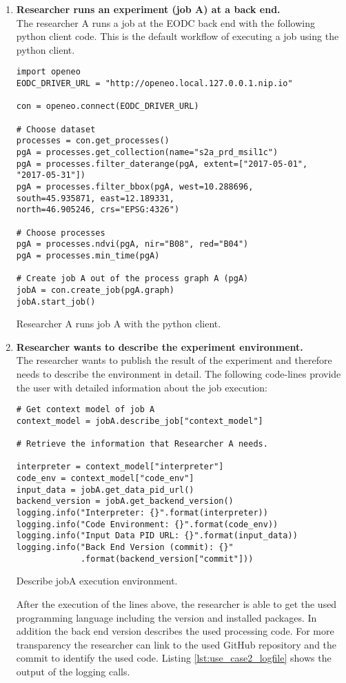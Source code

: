 \documentclass[draft,final]{vutinfth} %
\newenvironment{code}{\captionsetup{type=listing}}{}
\begin{document}
\begin{enumerate}
	\item \textbf{Researcher runs an experiment (job A) at a back end.}\\
	The researcher A runs a job at the EODC back end with the following python client code. This is the default workflow of executing a job using the python client.  

\begin{code}
	\begin{verbatim}
import openeo
EODC_DRIVER_URL = "http://openeo.local.127.0.0.1.nip.io"

con = openeo.connect(EODC_DRIVER_URL)

# Choose dataset
processes = con.get_processes()
pgA = processes.get_collection(name="s2a_prd_msil1c")
pgA = processes.filter_daterange(pgA, extent=["2017-05-01", 
"2017-05-31"])
pgA = processes.filter_bbox(pgA, west=10.288696, 
south=45.935871, east=12.189331, 
north=46.905246, crs="EPSG:4326")

# Choose processes
pgA = processes.ndvi(pgA, nir="B08", red="B04")
pgA = processes.min_time(pgA)

# Create job A out of the process graph A (pgA)
jobA = con.create_job(pgA.graph)
jobA.start_job()
	\end{verbatim}
	\caption{Researcher A runs job A with the python client.}
	\label{lst:impl_usecase2_1}
\end{code}
	\item \textbf{Researcher wants to describe the experiment environment.}\\
	The researcher wants to publish the result of the experiment and therefore needs to describe the environment in detail. The following code-lines provide the user with detailed information about the job execution:

\begin{code}
	\begin{verbatim}
# Get context model of job A
context_model = jobA.describe_job["context_model"]

# Retrieve the information that Researcher A needs.

interpreter = context_model["interpreter"]
code_env = context_model["code_env"]
input_data = jobA.get_data_pid_url()
backend_version = jobA.get_backend_version()
logging.info("Interpreter: {}".format(interpreter))
logging.info("Code Environment: {}".format(code_env))
logging.info("Input Data PID URL: {}".format(input_data))
logging.info("Back End Version (commit): {}"
             .format(backend_version["commit"]))
	\end{verbatim}
	\caption{Describe jobA execution environment.}
	\label{lst:impl_usecase2_2}
\end{code}
	After the execution of the lines above, the researcher is able to get the used programming language including the version and installed packages. In addition the back end version describes the used processing code. For more transparency the researcher can link to the used GitHub repository and the commit to identify the used code. Listing \ref{lst:use_case2_logfile} shows the output of the logging calls. 
	
\end{enumerate}
\end{document}
